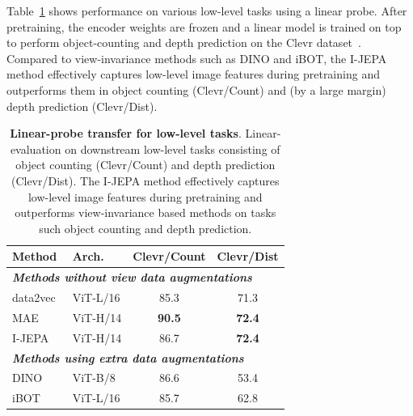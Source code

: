 \documentclass[10pt,twocolumn,letterpaper]{article}
\newcommand{\cc}{\cellcolor{fbApp}}
\newcommand{\fcg}{\color{black}}
\newcommand{\putalg}{{I-JEPA}\xspace}
\begin{document}
Table~\ref{tb:transfer-lowlevel} shows performance on various low-level tasks using a linear probe.
After pretraining, the encoder weights are frozen and a linear model is trained on top to perform object-counting and depth prediction on the Clevr dataset~\cite{clevr}.
Compared to view-invariance methods such as DINO and iBOT, the \putalg method effectively captures low-level image features during pretraining and outperforms them in object counting (Clevr/Count) and (by a large margin) depth prediction (Clevr/Dist).
\begin{table}[t]
    \centering
    \begin{tabular}{l l c c}
        \bf\small Method & \bf\small Arch. & \bf\small Clevr/Count & \bf\small Clevr/Dist \\
        \toprule
        \multicolumn{4}{l}{\small\bf\it Methods without view data augmentations}\\
        \fcg \small data2vec~\cite{baevski2022data2vec} & \fcg \small ViT-L/16 & \fcg 85.3 & \fcg 71.3 \\
        \fcg \small MAE~\cite{he2021masked} & \fcg \small ViT-H/14 & \fcg\bf  90.5 & \fcg \bf 72.4 \\
        \small \putalg & \cc\small ViT-H/14 & \cc 86.7 & \cc\bf 72.4 \\
        \midrule
        \multicolumn{4}{l}{\small\bf\it Methods using extra data augmentations}\\
        \small DINO~\cite{caron2021emerging} & \small ViT-B/8 & 86.6 & 53.4 \\
        \small iBOT~\cite{zhou2021ibotyes} & \small ViT-L/16 & 85.7 & 62.8
    \end{tabular}
    \caption{\textbf{Linear-probe transfer for low-level tasks}. Linear-evaluation on downstream low-level tasks consisting of object counting (Clevr/Count) and depth prediction (Clevr/Dist). The \putalg method effectively captures low-level image features during pretraining and outperforms view-invariance based methods on tasks such object counting and depth prediction.}
    \label{tb:transfer-lowlevel}
\end{table}
\end{document}
